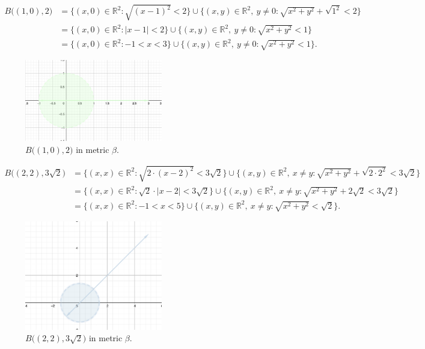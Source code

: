 \documentclass[a4paper,11pt]{article}
\begin{document}

\begin{align*} 
    B \big((1, 0), 2 \big) &= \{(x,0) \in \mathbb{R}^2 : \sqrt{(x - 1)^2} < 2 \} \cup \{(x, y) \in \mathbb{R}^2, \ y \neq 0 : \sqrt{x^2 + y^2} + \sqrt{1^2} < 2 \}
    \\
    &= \{(x,0) \in \mathbb{R}^2 : |x - 1| < 2 \} \cup \{(x,y) \in \mathbb{R}^2, \ y \neq 0 : \sqrt{x^2 + y^2} < 1 \} 
    \\
    &= \{(x,0) \in \mathbb{R}^2 : -1 < x < 3 \} \cup \{(x,y) \in \mathbb{R}^2, \ y \neq 0 : \sqrt{x^2 + y^2} < 1 \} .
\end{align*}

\begin{figure}[ht!]
    \centering
    \includegraphics[width=60mm]{c2.png}
    \caption{$B \big((1, 0), 2 \big)$ in metric $\beta$.}
\end{figure}


\begin{align*} 
    B \big((2, 2), 3 \sqrt{2} \big) &= \{(x,x) \in \mathbb{R}^2 : \sqrt{2 \cdot (x - 2)^2} < 3 \sqrt{2} \} \cup \{(x, y) \in \mathbb{R}^2, \ x \neq y : \sqrt{x^2 + y^2} + \sqrt{2 \cdot 2^2} < 3 \sqrt{2} \}
    \\
    &= \{(x,x) \in \mathbb{R}^2 : \sqrt{2} \cdot |x - 2| < 3 \sqrt{2} \} \cup \{(x,y) \in \mathbb{R}^2, \ x \neq y : \sqrt{x^2 + y^2} + 2 \sqrt{2} < 3 \sqrt{2} \} 
    \\
    &= \{(x,x) \in \mathbb{R}^2 : -1 < x < 5\} \cup \{(x,y) \in \mathbb{R}^2, \ x \neq y : \sqrt{x^2 + y^2} < \sqrt{2} \} .
\end{align*}

\begin{figure}[ht!]
    \centering
    \includegraphics[width=60mm]{c3.png}
    \caption{$B \big((2, 2), 3 \sqrt{2} \big)$ in metric $\beta$.}
\end{figure}
\end{document}
